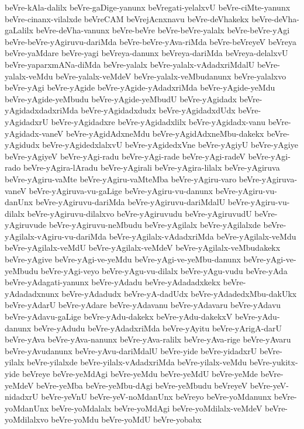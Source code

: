 {beVre-kAla-dalilx
beVre-gaDige-yanunx
beVregati-yelalxvU
beVre-ciMte-yanunx
beVre-cinanx-vilalxde
beVreCAM
beVrejAcnxnavu
beVre-deVhakekx
beVre-deVha-gaLalilx
beVre-deVha-vanunx
beVre-beVre
beVre-beVre-yalalx
beVre-beVre-yAgi
beVre-beVre-yAgiruvu-dariMda
beVre-beVre-yAva-riMda
beVre-beVreyeV
beVreya
beVre-yaMdare
beVre-yagi
beVreya-danunx
beVreya-dariMda
beVreya-delalxvU
beVre-yaparxmANa-diMda
beVre-yalalx
beVre-yalalx-vAdadxriMdalU
beVre-yalalx-veMdu
beVre-yalalx-veMdeV
beVre-yalalx-veMbudanunx
beVre-yalalxvo
beVre-yAgi
beVre-yAgide
beVre-yAgide-yAdadxriMda
beVre-yAgide-yeMdu
beVre-yAgide-yeMbudu
beVre-yAgide-yeMbudU
beVre-yAgidadx
beVre-yAgidadxdadxriMda
beVre-yAgidadxdudx
beVre-yAgidadxdUdx
beVre-yAgidadxrU
beVre-yAgidadxre
beVre-yAgidadxlilx
beVre-yAgidadx-vanu
beVre-yAgidadx-vaneV
beVre-yAgidAdxneMdu
beVre-yAgidAdxneMbu-dakekx
beVre-yAgidudx
beVre-yAgidedxlalxvU
beVre-yAgidedxVne
beVre-yAgiyU
beVre-yAgiye
beVre-yAgiyeV
beVre-yAgi-radu
beVre-yAgi-rade
beVre-yAgi-radeV
beVre-yAgi-rado
beVre-yAgira-lAradu
beVre-yAgirali
beVre-yAgira-lilalx
beVre-yAgiruva
beVre-yAgiru-vaMte
beVre-yAgiru-vaMteMba
beVre-yAgiru-varo
beVre-yAgiruva-vaneV
beVre-yAgiruva-vu-gaLige
beVre-yAgiru-vu-danunx
beVre-yAgiru-vu-danUnx
beVre-yAgiruvu-dariMda
beVre-yAgiruvu-dariMdalU
beVre-yAgiru-vu-dilalx
beVre-yAgiruvu-dilalxvo
beVre-yAgiruvudu
beVre-yAgiruvudU
beVre-yAgiruvude
beVre-yAgiruvu-neMbudu
beVre-yAgilalx
beVre-yAgilalxde
beVre-yAgilalx-vAgiru-vu-dariMda
beVre-yAgilalx-vAdadxriMda
beVre-yAgilalx-veMdu
beVre-yAgilalx-veMdU
beVre-yAgilalx-veMdeV
beVre-yAgilalx-veMbudakekx
beVre-yAgive
beVre-yAgi-ve-yeMdu
beVre-yAgi-ve-yeMbu-danunx
beVre-yAgi-ve-yeMbudu
beVre-yAgi-veyo
beVre-yAgu-vu-dilalx
beVre-yAgu-vudu
beVre-yAda
beVre-yAdagati-yanunx
beVre-yAdadu
beVre-yAdadadxkekx
beVre-yAdadadxnunx
beVre-yAdadudx
beVre-yA-dadUdx
beVre-yAdadedxMbu-dakUkx
beVre-yAdarU
beVre-yAdare
beVre-yAdavanu
beVre-yAdavaru
beVre-yAdavu
beVre-yAdavu-gaLige
beVre-yAdu-dakekx
beVre-yAdu-dakekxV
beVre-yAdu-danunx
beVre-yAdudu
beVre-yAdadxriMda
beVre-yAyitu
beVre-yArigA-darU
beVre-yAva
beVre-yAva-nanunx
beVre-yAva-ralilx
beVre-yAva-rige
beVre-yAvaru
beVre-yAvudanunx
beVre-yAvu-dariMdalU
beVre-yide
beVre-yidadxrU
beVre-yilalx
beVre-yilalxde
beVre-yilalx-vAdadxriMda
beVre-yilalx-veMdu
beVre-yukitx-yide
beVreye
beVre-yeMdAgi
beVre-yeMdu
beVre-yeMdU
beVre-yeMde
beVre-yeMdeV
beVre-yeMba
beVre-yeMbu-dAgi
beVre-yeMbudu
beVreyeV
beVre-yeV-nidadxrU
beVre-yeVnU
beVre-yeV-noMdanUnx
beVreyo
beVre-yoMdanunx
beVre-yoMdanUnx
beVre-yoMdalalx
beVre-yoMdAgi
beVre-yoMdilalx-veMdeV
beVre-yoMdilalxvo
beVre-yoMdu
beVre-yoMdU
beVre-yobabx
}
